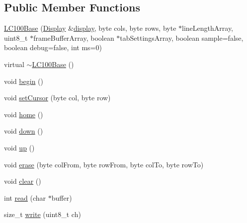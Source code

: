 \subsection*{Public Member Functions}
\begin{DoxyCompactItemize}
\item 
\hyperlink{classcom_1_1diag_1_1amigo_1_1LC100Base_a0ae2e5e38c16b74237104acc7a75003c}{LC100Base} (\hyperlink{structcom_1_1diag_1_1amigo_1_1Display}{Display} \&\hyperlink{TinyTerminal_8ino_aa69ecd18e38aaa6c48d94adc9f91f0ef}{display}, byte cols, byte rows, byte $\ast$lineLengthArray, uint8\_\-t $\ast$frameBufferArray, boolean $\ast$tabSettingsArray, boolean sample=false, boolean debug=false, int ms=0)
\item 
\hypertarget{classcom_1_1diag_1_1amigo_1_1LC100Base_ae52a40ef99cf562e26b1f3e2ac072fe5}{
virtual \hyperlink{classcom_1_1diag_1_1amigo_1_1LC100Base_ae52a40ef99cf562e26b1f3e2ac072fe5}{$\sim$LC100Base} ()}
\label{classcom_1_1diag_1_1amigo_1_1LC100Base_ae52a40ef99cf562e26b1f3e2ac072fe5}

\item 
void \hyperlink{classcom_1_1diag_1_1amigo_1_1LC100Base_a3cf988ae645ac743c6b5cafa2748e30b}{begin} ()
\item 
void \hyperlink{classcom_1_1diag_1_1amigo_1_1LC100Base_aadfb19a306738b52afb990734a412b94}{setCursor} (byte col, byte row)
\item 
\hypertarget{classcom_1_1diag_1_1amigo_1_1LC100Base_aaa8a0afa8ba3d93bc7230f42d794c620}{
void \hyperlink{classcom_1_1diag_1_1amigo_1_1LC100Base_aaa8a0afa8ba3d93bc7230f42d794c620}{home} ()}
\label{classcom_1_1diag_1_1amigo_1_1LC100Base_aaa8a0afa8ba3d93bc7230f42d794c620}

\item 
void \hyperlink{classcom_1_1diag_1_1amigo_1_1LC100Base_af532b82f424d25c8a7b014f16a463abb}{down} ()
\item 
void \hyperlink{classcom_1_1diag_1_1amigo_1_1LC100Base_a836be0f28470396a23a3c28ef835c33d}{up} ()
\item 
void \hyperlink{classcom_1_1diag_1_1amigo_1_1LC100Base_a4a92d06a7c79b66d6fa47581c727f688}{erase} (byte colFrom, byte rowFrom, byte colTo, byte rowTo)
\item 
\hypertarget{classcom_1_1diag_1_1amigo_1_1LC100Base_a91d4bc06663d0d6d9c0e550e3175a55b}{
void \hyperlink{classcom_1_1diag_1_1amigo_1_1LC100Base_a91d4bc06663d0d6d9c0e550e3175a55b}{clear} ()}
\label{classcom_1_1diag_1_1amigo_1_1LC100Base_a91d4bc06663d0d6d9c0e550e3175a55b}

\item 
int \hyperlink{classcom_1_1diag_1_1amigo_1_1LC100Base_a2bbb2cc266ee6a1b9194f12c1ce9c1bf}{read} (char $\ast$buffer)
\item 
size\_\-t \hyperlink{classcom_1_1diag_1_1amigo_1_1LC100Base_aa65643803194c15f83e0204d3523ec7e}{write} (uint8\_\-t ch)
\end{DoxyCompactItemize}
